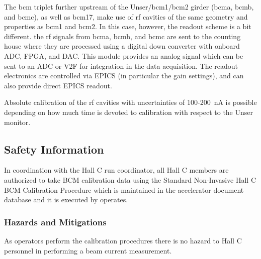 {The bcm triplet further upstream of the Unser/bcm1/bcm2 girder (bcma,
bcmb, and bcmc), as well as bcm17, make use of rf cavities of the same
geometry and properties as bcm1 and bcm2. In this case, however, the
readout scheme is a bit different. the rf signals from bcma, bcmb, and
bcmc are sent to the counting house where they are processed using a
digital down converter with onboard ADC, FPGA, and DAC. This module
provides an analog signal which can be sent to an ADC or V2F for
integration in the data acquisition. The readout electronics are
controlled via EPICS (in particular the gain settings), and can also
provide direct EPICS readout.

Absolute calibration of the rf cavities with uncertainties of
100-200~nA is possible depending on how much time is devoted to
calibration with respect to the Unser monitor.

\begin{safetyen}{0}{0}
\subsection{Safety Information}
In coordination with the Hall C run coordinator, all Hall C members
are authorized to take BCM calibration data using the Standard
Non-Invasive Hall C BCM Calibration Procedure which is maintained in
the accelerator document database and it is executed by operates.


\subsubsection{Hazards and Mitigations}

As operators perform the calibration procedures there is no hazard to
Hall C personnel in performing a beam current measurement.


\end{safetyen}}
